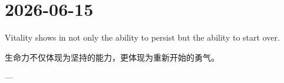 \section*{2026-06-15}
Vitality shows in not only the ability to persist but the ability to start over. \par
生命力不仅体现为坚持的能力，更体现为重新开始的勇气。 \par
\hfill ---  \par
